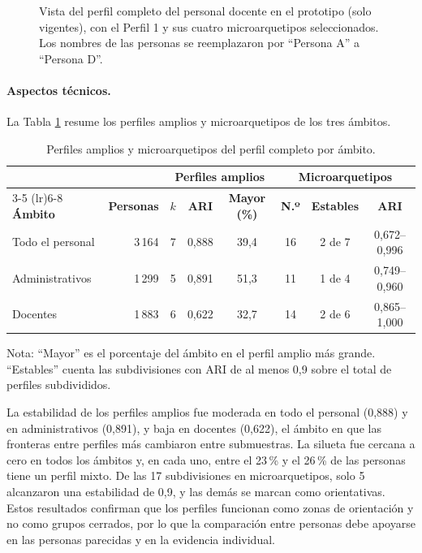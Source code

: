 \begin{figure}[!htbp]
    \centering
    \caption{Vista del perfil completo del personal docente en el prototipo (solo vigentes), con el Perfil 1 y sus cuatro microarquetipos seleccionados. Los nombres de las personas se reemplazaron por ``Persona A'' a ``Persona D''.}
    \label{fig:captura_perfil}
\end{figure}

\paragraph{Aspectos técnicos.}
La Tabla \ref{tab:perfil_completo} resume los perfiles amplios y microarquetipos de los tres ámbitos.

\begin{table}[!htbp]
    \centering
    \caption{Perfiles amplios y microarquetipos del perfil completo por ámbito.}
    \label{tab:perfil_completo}
    \footnotesize
    \begin{tabular}{p{2.6cm} r c c c c c c}
        \toprule
        & & \multicolumn{3}{c}{\textbf{Perfiles amplios}} & \multicolumn{3}{c}{\textbf{Microarquetipos}} \\
        \cmidrule(lr){3-5} \cmidrule(lr){6-8}
        \textbf{Ámbito} & \textbf{Personas} & $k$ & \textbf{ARI} & \textbf{Mayor (\%)} & \textbf{N.º} & \textbf{Estables} & \textbf{ARI} \\
        \midrule
        Todo el personal & 3\,164 & 7 & 0,888 & 39,4 & 16 & 2 de 7 & 0,672--0,996 \\
        Administrativos & 1\,299 & 5 & 0,891 & 51,3 & 11 & 1 de 4 & 0,749--0,960 \\
        Docentes & 1\,883 & 6 & 0,622 & 32,7 & 14 & 2 de 6 & 0,865--1,000 \\
        \bottomrule
    \end{tabular}
    \par\smallskip
    \raggedright\footnotesize Nota: ``Mayor'' es el porcentaje del ámbito en el perfil amplio más grande. ``Estables'' cuenta las subdivisiones con ARI de al menos 0,9 sobre el total de perfiles subdivididos.
\end{table}

La estabilidad de los perfiles amplios fue moderada en todo el personal (0,888) y en administrativos (0,891), y baja en docentes (0,622), el ámbito en que las fronteras entre perfiles más cambiaron entre submuestras. La silueta fue cercana a cero en todos los ámbitos y, en cada uno, entre el 23\,\% y el 26\,\% de las personas tiene un perfil mixto. De las 17 subdivisiones en microarquetipos, solo 5 alcanzaron una estabilidad de 0,9, y las demás se marcan como orientativas. Estos resultados confirman que los perfiles funcionan como zonas de orientación y no como grupos cerrados, por lo que la comparación entre personas debe apoyarse en las personas parecidas y en la evidencia individual.

